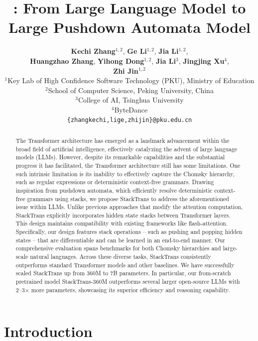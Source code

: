 \documentclass{article}
\title{\textbfmethod: From Large Language Model to Large Pushdown Automata Model}
\author{\textbf{Kechi Zhang}$^{1,2}$,  \textbf{Ge Li}$^{1,2}$\footnotemark[1], \textbf{Jia Li}$^{1,2}$, \\ \textbf{Huangzhao Zhang}, \textbf{Yihong Dong}$^{1,2}$, \textbf{Jia Li}$^{3}$, \textbf{Jingjing Xu}$^{4}$, \\ \textbf{Zhi Jin}$^{1,2}$\footnotemark[1] \\
$^1$Key Lab of High Confidence Software Technology (PKU), Ministry of Education \\
$^2$School of Computer Science, Peking University, China \\
$^3$College of AI, Tsinghua University \\
$^4$ByteDance \\
\texttt{\{zhangkechi,lige,zhijin\}@pku.edu.cn}}
\DeclareRobustCommand{\method}{{\sc StackTrans}\xspace}
\begin{document}

\maketitle


\begin{abstract}

The Transformer architecture has emerged as a landmark advancement within the broad field of artificial intelligence, effectively catalyzing the advent of large language models (LLMs).
However, despite its remarkable capabilities and the substantial progress it has facilitated, the Transformer architecture still has some limitations.
One such intrinsic limitation is its inability to effectively capture the Chomsky hierarchy, such as regular expressions or deterministic context-free grammars.
Drawing inspiration from pushdown automata, which efficiently resolve deterministic context-free grammars using stacks, we propose \method to address the aforementioned issue within LLMs.
Unlike previous approaches that modify the attention computation, \method explicitly incorporates hidden state stacks between Transformer layers. This design maintains compatibility with existing frameworks like flash-attention.  
Specifically, our design features stack operations -- such as pushing and popping hidden states -- that are differentiable and can be learned in an end-to-end manner.
Our comprehensive evaluation spans benchmarks for both Chomsky hierarchies and large-scale natural languages. 
Across these diverse tasks, \method consistently outperforms standard Transformer models and other baselines. 
We have successfully scaled \method up from 360M to 7B parameters. In particular, our from-scratch pretrained model \method-360M outperforms several larger open-source LLMs with 2–3$\times$ more parameters, showcasing its superior efficiency and reasoning capability. 

\end{abstract}




\section{Introduction}
\label{sec:intro}
\end{document}
